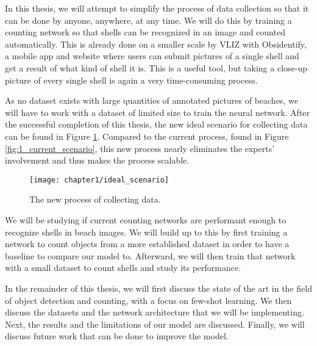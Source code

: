 In this thesis, we will attempt to simplify the process of data collection so that it can be done by anyone, anywhere, at any time. We will do this by training a counting network so that shells can be recognized in an image and counted automatically. This is already done on a smaller scale by VLIZ with Obsidentify, a mobile app and website where users can submit pictures of a single shell and get a result of what kind of shell it is. This is a useful tool, but taking a close-up picture of every single shell is again a very time-consuming process. 

As no dataset exists with large quantities of annotated pictures of beaches, we will have to work with a dataset of limited size to train the neural network. After the successful completion of this thesis, the new ideal scenario for collecting data can be found in Figure \ref{fig:1_ideal_scenario}. Compared to the current process, found in Figure \ref{fig:1_current_scenario}, this new process nearly eliminates the experts' involvement and thus makes the process scalable.

\begin{figure}[h]
	\centering
	\texttt{[image: chapter1/ideal\_scenario]}
	\caption{The new process of collecting data.}
	\label{fig:1_ideal_scenario}
\end{figure}

We will be studying if current counting networks are performant enough to recognize shells in beach images. We will build up to this by first training a network to count objects from a more established dataset in order to have a baseline to compare our model to. Afterward, we will then train that network with a small dataset to count shells and study its performance.

In the remainder of this thesis, we will first discuss the state of the art in the field of object detection and counting, with a focus on few-shot learning. We then discuss the datasets and the network architecture that we will be implementing. Next, the results and the limitations of our model are discussed. Finally, we will discuss future work that can be done to improve the model.
